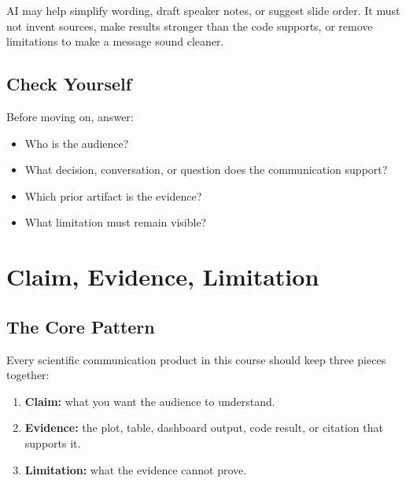 \documentclass[
  letterpaper,
  DIV=11,
  numbers=noendperiod,
  oneside]{scrreprt}
\providecommand{\tightlist}{%
  \setlength{\itemsep}{0pt}\setlength{\parskip}{0pt}}
\begin{document}

AI may help simplify wording, draft speaker notes, or suggest slide
order. It must not invent sources, make results stronger than the code
supports, or remove limitations to make a message sound cleaner.

\section*{Check Yourself}\label{check-yourself}


Before moving on, answer:

\begin{itemize}
\tightlist
\item
  Who is the audience?
\item
  What decision, conversation, or question does the communication
  support?
\item
  Which prior artifact is the evidence?
\item
  What limitation must remain visible?
\end{itemize}

\chapter*{Claim, Evidence, Limitation}\label{claim-evidence-limitation}


\section*{The Core Pattern}\label{the-core-pattern}


Every scientific communication product in this course should keep three
pieces together:

\begin{enumerate}
\def\labelenumi{\arabic{enumi}.}
\tightlist
\item
  \textbf{Claim:} what you want the audience to understand.
\item
  \textbf{Evidence:} the plot, table, dashboard output, code result, or
  citation that supports it.
\item
  \textbf{Limitation:} what the evidence cannot prove.
\end{enumerate}
\end{document}
